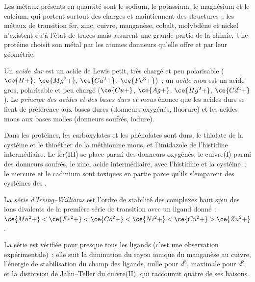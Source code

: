 Les métaux présents en quantité sont le sodium, le potassium, le magnésium
et le calcium, qui portent surtout des charges et maintiennent des
structures~; les métaux de transition fer, zinc, cuivre, manganèse, cobalt,
molybdène et nickel n'existent qu'à l'état de traces mais assurent une
grande partie de la chimie. Une protéine choisit son métal par les atomes
donneurs qu'elle offre et par leur géométrie.

\begin{definition}\label{def:b3:bioinorganic:hsab}
Un \emph{acide dur} est un acide de Lewis petit, très chargé et peu
polarisable ($\ce{H+}$, $\ce{Mg^2+}$, $\ce{Ca^2+}$, $\ce{Fe^3+}$)~; un \emph{acide mou} est un acide
gros, polarisable et peu chargé ($\ce{Cu+}$, $\ce{Ag+}$,
$\ce{Hg^2+}$, $\ce{Cd^2+}$). Le \emph{principe des acides et des bases durs et mous}
énonce que les acides durs se lient de préférence aux bases dures (donneurs
oxygénés, fluorure) et les acides mous aux bases molles (donneurs soufrés,
iodure).
\end{definition}

Dans les protéines, les carboxylates et les phénolates sont durs, le
thiolate de la cystéine et le thioéther de la méthionine mous, et
l'imidazole de l'histidine intermédiaire. Le fer(III) se place parmi des
donneurs oxygénés, le cuivre(I) parmi des donneurs soufrés, le zinc, acide
intermédiaire, avec l'histidine et la cystéine~; le mercure et le cadmium
sont toxiques en partie parce qu'ils s'emparent des cystéines des .

\begin{definition}\label{def:b3:bioinorganic:irving-williams}
La \emph{série d'Irving--Williams} est l'ordre de stabilité
des complexes haut spin des ions divalents de la première série de
transition avec un ligand donné~:
$\ce{Mn^2+} < \ce{Fe^2+} < \ce{Co^2+} < \ce{Ni^2+} < \ce{Cu^2+} > \ce{Zn^2+}$.
\end{definition}

\begin{proposition}\label{prop:b3:bioinorganic:irving-williams}
La série est vérifiée pour presque tous les ligands (c'est une observation
expérimentale)~; elle suit la diminution du rayon ionique du manganèse au
cuivre, l'énergie de stabilisation du champ des ligands, nulle pour $d^5$, maximale pour $d^8$, et la
distorsion de Jahn--Teller du cuivre(II), qui raccourcit quatre de ses
liaisons.
\end{proposition}

